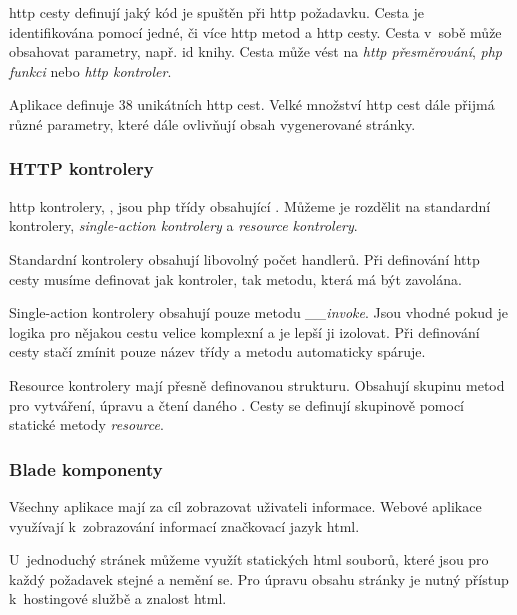 \acrshort{http} cesty definují jaký kód je spuštěn při \acrshort{http} požadavku. Cesta je identifikována pomocí jedné, či více \acrshort{http} metod a \acrshort{http} cesty. Cesta v~sobě může obsahovat parametry, např. id knihy. Cesta může vést na \emph{\acrshort{http} přesměrování}, \emph{\acrshort{php} funkci} nebo \emph{\acrshort{http} kontroler}.

Aplikace \bso definuje 38 unikátních \acrshort{http} cest. Velké množství \acrshort{http} cest dále přijmá různé parametry, které dále ovlivňují obsah vygenerované stránky.

\subsubsection{HTTP kontrolery}

\acrshort{http} kontrolery, \inlaravel, jsou \acrshort{php} třídy obsahující . Můžeme je rozdělit na standardní kontrolery, \emph{single-action kontrolery}\cite{laravel-controller-single-action} a \emph{resource kontrolery}\cite{laravel-controller-resource}.

Standardní kontrolery obsahují libovolný počet handlerů. Při definování \acrshort{http} cesty musíme definovat jak kontroler, tak metodu, která má být zavolána.

Single-action kontrolery obsahují pouze metodu \emph{\_\_invoke}. Jsou vhodné pokud je logika pro nějakou cestu velice komplexní a je lepší ji izolovat. Při definování cesty stačí zmínit pouze název třídy a  metodu automaticky spáruje.

Resource kontrolery mají přesně definovanou strukturu. Obsahují skupinu metod pro vytváření, úpravu a čtení daného . Cesty se definují skupinově pomocí statické metody \emph{resource}.

\subsubsection{Blade komponenty}

Všechny aplikace mají za cíl zobrazovat uživateli informace. Webové aplikace využívají k~zobrazování informací značkovací jazyk \acrshort{html}.

U~jednoduchý stránek můžeme využít statických \acrshort{html} souborů, které jsou pro každý požadavek stejné a nemění se. Pro úpravu obsahu stránky je nutný přístup k~hostingové službě a znalost \acrshort{html}.

